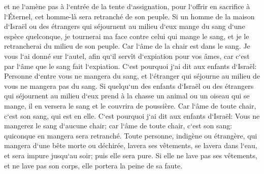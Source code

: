 \verse et ne l`amène pas à l`entrée de la tente d`assignation, pour l`offrir en sacrifice à l`Éternel, cet homme-là sera retranché de son peuple. 
\verse Si un homme de la maison d`Israël ou des étrangers qui séjournent au milieu d`eux mange du sang d`une espèce quelconque, je tournerai ma face contre celui qui mange le sang, et je le retrancherai du milieu de son peuple. 
\verse Car l`âme de la chair est dans le sang. Je vous l`ai donné sur l`autel, afin qu`il servît d`expiation pour vos âmes, car c`est par l`âme que le sang fait l`expiation. 
\verse C`est pourquoi j`ai dit aux enfants d`Israël: Personne d`entre vous ne mangera du sang, et l`étranger qui séjourne au milieu de vous ne mangera pas du sang. 
\verse Si quelqu`un des enfants d`Israël ou des étrangers qui séjournent au milieu d`eux prend à la chasse un animal ou un oiseau qui se mange, il en versera le sang et le couvrira de poussière. 
\verse Car l`âme de toute chair, c`est son sang, qui est en elle. C`est pourquoi j`ai dit aux enfants d`Israël: Vous ne mangerez le sang d`aucune chair; car l`âme de toute chair, c`est son sang: quiconque en mangera sera retranché. 
\verse Toute personne, indigène ou étrangère, qui mangera d`une bête morte ou déchirée, lavera ses vêtements, se lavera dans l`eau, et sera impure jusqu`au soir; puis elle sera pure. 
\verse Si elle ne lave pas ses vêtements, et ne lave pas son corps, elle portera la peine de sa faute. 

